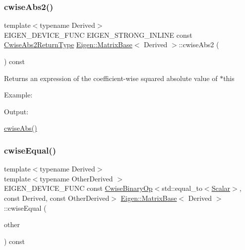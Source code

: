 \subsubsection{\texorpdfstring{cwiseAbs2()}{cwiseAbs2()}}
{\footnotesize\ttfamily template$<$typename Derived$>$ \\
E\+I\+G\+E\+N\+\_\+\+D\+E\+V\+I\+C\+E\+\_\+\+F\+U\+NC E\+I\+G\+E\+N\+\_\+\+S\+T\+R\+O\+N\+G\+\_\+\+I\+N\+L\+I\+NE const \mbox{\hyperlink{class_eigen_1_1_cwise_unary_op}{Cwise\+Abs2\+Return\+Type}} \mbox{\hyperlink{class_eigen_1_1_matrix_base}{Eigen\+::\+Matrix\+Base}}$<$ Derived $>$\+::cwise\+Abs2 (\begin{DoxyParamCaption}{ }\end{DoxyParamCaption}) const\hspace{0.3cm}{\ttfamily [inline]}}

\begin{DoxyReturn}{Returns}
an expression of the coefficient-\/wise squared absolute value of {\ttfamily $\ast$this} 
\end{DoxyReturn}
Example\+: 
\begin{DoxyCodeInclude}{0}
\end{DoxyCodeInclude}
 Output\+: 
\begin{DoxyVerbInclude}
\end{DoxyVerbInclude}
 \mbox{\hyperlink{class_eigen_1_1_matrix_base_a8f2dbd5d9573c79c5dd356ddb29a0ee9}{cwise\+Abs()}} \mbox{\label{class_eigen_1_1_matrix_base_a1d63c6dd2c0c6c8186fdabdf55ee1f58}} 
\subsubsection{\texorpdfstring{cwiseEqual()}{cwiseEqual()}\hspace{0.1cm}{\footnotesize\ttfamily [1/2]}}
{\footnotesize\ttfamily template$<$typename Derived$>$ \\
template$<$typename Other\+Derived $>$ \\
E\+I\+G\+E\+N\+\_\+\+D\+E\+V\+I\+C\+E\+\_\+\+F\+U\+NC const \mbox{\hyperlink{class_eigen_1_1_cwise_binary_op}{Cwise\+Binary\+Op}}$<$std\+::equal\+\_\+to$<$\mbox{\hyperlink{class_eigen_1_1_dense_base_a5feed465b3a8e60c47e73ecce83e39a2}{Scalar}}$>$, const Derived, const Other\+Derived$>$ \mbox{\hyperlink{class_eigen_1_1_matrix_base}{Eigen\+::\+Matrix\+Base}}$<$ Derived $>$\+::cwise\+Equal (\begin{DoxyParamCaption}\item[{const E\+I\+G\+E\+N\+\_\+\+C\+U\+R\+R\+E\+N\+T\+\_\+\+S\+T\+O\+R\+A\+G\+E\+\_\+\+B\+A\+S\+E\+\_\+\+C\+L\+A\+SS$<$ Other\+Derived $>$ \&}]{other }\end{DoxyParamCaption}) const\hspace{0.3cm}{\ttfamily [inline]}}

